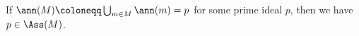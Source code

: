 If $\ann(M)\coloneqq\bigcup_{m \in M}\ann(m) = p$ for some prime ideal $p$, then
we have $p \in \Ass(M)$.
